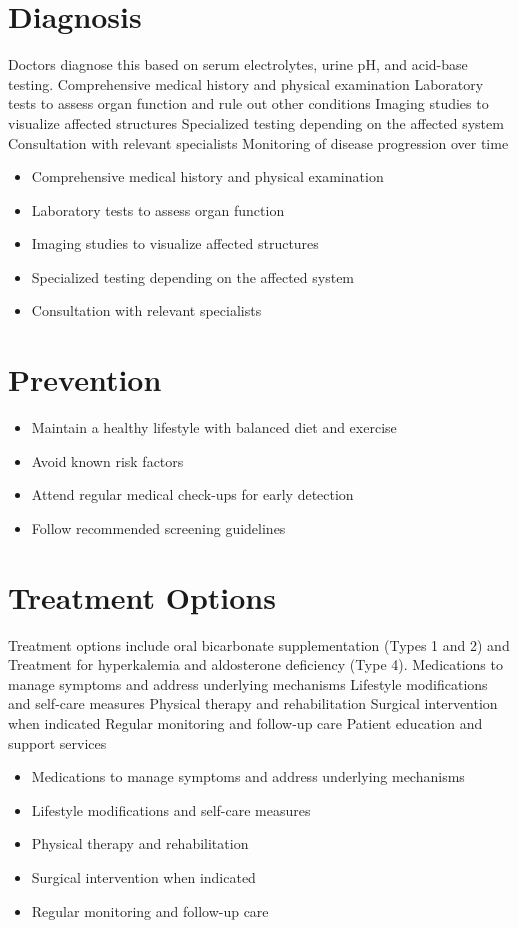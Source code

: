 \section{Diagnosis}
Doctors diagnose this based on serum electrolytes, urine pH, and acid-base testing. Comprehensive medical history and physical examination Laboratory tests to assess organ function and rule out other conditions Imaging studies to visualize affected structures Specialized testing depending on the affected system Consultation with relevant specialists Monitoring of disease progression over time

\begin{itemize}[noitemsep]
  \item Comprehensive medical history and physical examination
  \item Laboratory tests to assess organ function
  \item Imaging studies to visualize affected structures
  \item Specialized testing depending on the affected system
  \item Consultation with relevant specialists
\end{itemize}
\section{Prevention}
\begin{itemize}[noitemsep]
  \item Maintain a healthy lifestyle with balanced diet and exercise
  \item Avoid known risk factors
  \item Attend regular medical check-ups for early detection
  \item Follow recommended screening guidelines
\end{itemize}
\section{Treatment Options}
Treatment options include oral bicarbonate supplementation (Types 1 and 2) and Treatment for hyperkalemia and aldosterone deficiency (Type 4). Medications to manage symptoms and address underlying mechanisms Lifestyle modifications and self-care measures Physical therapy and rehabilitation Surgical intervention when indicated Regular monitoring and follow-up care Patient education and support services

\begin{itemize}[noitemsep]
  \item Medications to manage symptoms and address underlying mechanisms
  \item Lifestyle modifications and self-care measures
  \item Physical therapy and rehabilitation
  \item Surgical intervention when indicated
  \item Regular monitoring and follow-up care
\end{itemize}
